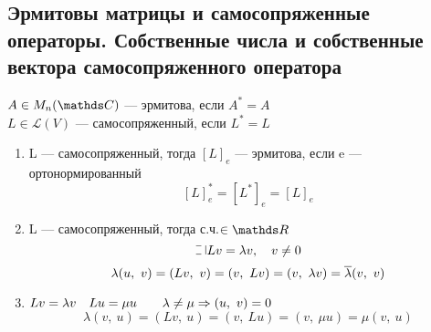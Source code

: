\documentclass[main]{subfiles}
\begin{document}
    \subsection{Эрмитовы матрицы и самосопряженные операторы. Собственные числа и собственные вектора самосопряженного оператора}
    \begin{definition}
        $A \in M_n (\CC)$ --- эрмитова, если $A^* = A$\\
        $L \in \mathscr{L}(V)$ --- самосопряженный, если $L^* = L$
    \end{definition}

    \begin{properties}
        \begin{enumerate}
            \item L --- самосопряженный, тогда $[L]_e$ --- эрмитова, если e --- ортонормированный
                \[[L]_e^* = [L^*]_e = [L]_e\]
            \item L --- самосопряженный, тогда с.ч.$\in \R$
                \[\letus Lv = \lambda v,\q v \neq 0\]
                \[\lambda(u,\ v) = (Lv,\ v) = (v,\ Lv) = (v,\ \lambda v) = \ol{\lambda} (v,\ v)\]
            \item $Lv = \lambda v\quad Lu = \mu u \qquad \lambda \neq \mu \Rightarrow (u,\ v) = 0$
                \[\lambda (v,\ u) = (Lv,\ u) = (v,\ Lu) = (v,\ \mu u) = \mu (v,\ u)\]
        \end{enumerate}
    \end{properties}
\end{document}
